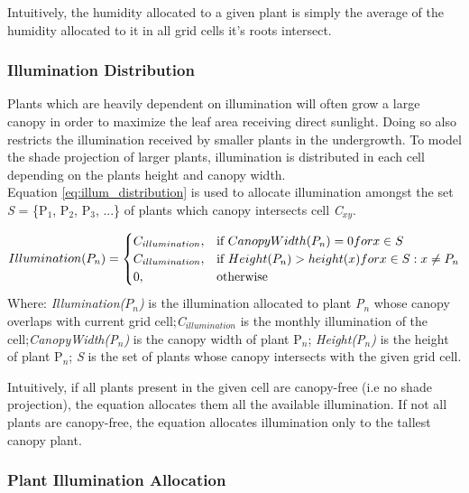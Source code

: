 Intuitively, the humidity allocated to a given plant is simply the average of the humidity allocated to it in all grid cells it's roots intersect.

\subsubsection{Illumination Distribution}

Plants which are heavily dependent on illumination will often grow a large canopy in order to maximize the leaf area receiving direct sunlight. Doing so also restricts the illumination received by smaller plants in the undergrowth. To model the shade projection of larger plants, illumination is distributed in each cell depending on the plants height and canopy width.\\

Equation \ref{eq:illum_distribution} is used to allocate illumination amongst the set \textit{S} = \{P$_{1}$, P$_{2}$, P$_{3}$, ...\} of plants which canopy intersects cell \textit{C$_{xy}$}.

\begin{equation}
\centering
Illumination(P_{n}) = 
\begin{cases}
	C_{illumination}, & \text{if } CanopyWidth(P_{n}) = 0 for x \in S \\
	C_{illumination}, & \text{if } Height(P_{n}) > height(x) for x \in S : x \neq P_{n} \\
    0,              & \text{otherwise}
\end{cases}
\label{eq:illum_distribution}
\end{equation}
Where: \textit{Illumination($P_{n}$)} is the illumination allocated to plant \textit{P$_{n}$} whose canopy overlaps with current grid cell;\textit{C$_{illumination}$} is the monthly illumination of the cell;\textit{CanopyWidth(P$_{n}$)} is the canopy width of plant P$_{n}$; \textit{Height(P$_{n}$)} is the height of plant P$_{n}$; \textit{S} is the set of plants whose canopy intersects with the given grid cell.

Intuitively, if all plants present in the given cell are canopy-free (i.e no shade projection), the equation allocates them all the available illumination. If not all plants are canopy-free, the equation allocates illumination only to the tallest canopy plant.

\subsubsection{Plant Illumination Allocation}

